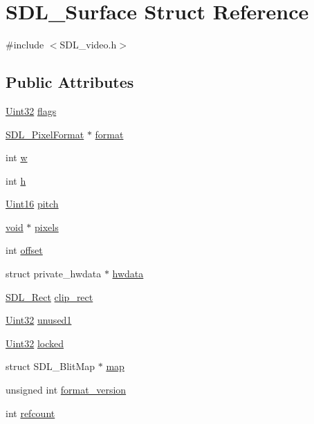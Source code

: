 \hypertarget{struct_s_d_l___surface}{}\section{S\+D\+L\+\_\+\+Surface Struct Reference}
\label{struct_s_d_l___surface}


{\ttfamily \#include $<$S\+D\+L\+\_\+video.\+h$>$}

\subsection*{Public Attributes}
\begin{DoxyCompactItemize}
\item 
\hyperlink{_s_d_l__stdinc_8h_add440eff171ea5f55cb00c4a9ab8672d}{Uint32} \hyperlink{struct_s_d_l___surface_a86d78b665d5dfd7aa1dd9696b067641b}{flags}
\item 
\hyperlink{struct_s_d_l___pixel_format}{S\+D\+L\+\_\+\+Pixel\+Format} $\ast$ \hyperlink{struct_s_d_l___surface_a0a90721f947c10c3b79e02ccb419ca62}{format}
\item 
int \hyperlink{struct_s_d_l___surface_a9b0ec7185dcdb2a3530a9160a6ea83d9}{w}
\item 
int \hyperlink{struct_s_d_l___surface_af33bcf87a1f5e10a99b3c7e8626b38c8}{h}
\item 
\hyperlink{_s_d_l__stdinc_8h_a31fcc0a076c9068668173ee26d33e42b}{Uint16} \hyperlink{struct_s_d_l___surface_a53fd25784c0f6efd7dd19bb0afce5452}{pitch}
\item 
\hyperlink{_s_d_l__opengl_8h_a3db05964a3cc4410f35b7ea2b7eb850d}{void} $\ast$ \hyperlink{struct_s_d_l___surface_abd9597e0e084b8ef33fe0397bc26d911}{pixels}
\item 
int \hyperlink{struct_s_d_l___surface_ab40c060fa976dbb25bebc7869132ffda}{offset}
\item 
struct private\+\_\+hwdata $\ast$ \hyperlink{struct_s_d_l___surface_a2d3ce688b6cfb72875f2411ea0560f18}{hwdata}
\item 
\hyperlink{struct_s_d_l___rect}{S\+D\+L\+\_\+\+Rect} \hyperlink{struct_s_d_l___surface_aa9a0da3b38261dad6cf0cc4e3bb5b0c3}{clip\+\_\+rect}
\item 
\hyperlink{_s_d_l__stdinc_8h_add440eff171ea5f55cb00c4a9ab8672d}{Uint32} \hyperlink{struct_s_d_l___surface_a41066cf7cc91d2f032dd0f29cc418ec4}{unused1}
\item 
\hyperlink{_s_d_l__stdinc_8h_add440eff171ea5f55cb00c4a9ab8672d}{Uint32} \hyperlink{struct_s_d_l___surface_ae807b7e4f4174d56e6cf40df12c8cefe}{locked}
\item 
struct S\+D\+L\+\_\+\+Blit\+Map $\ast$ \hyperlink{struct_s_d_l___surface_a8c1ecad399b0d4f525b1a53b6ee9393f}{map}
\item 
unsigned int \hyperlink{struct_s_d_l___surface_a71e84e52b2faf69be9739f97b248342a}{format\+\_\+version}
\item 
int \hyperlink{struct_s_d_l___surface_a03d10628a359c0674f5ceffd574f1641}{refcount}
\end{DoxyCompactItemize}


